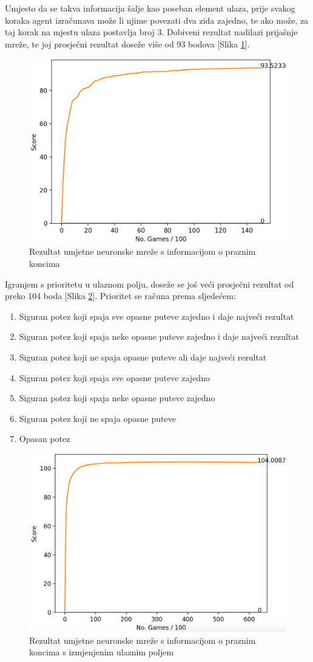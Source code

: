 \documentclass[zavrsnirad]{fer}
\begin{document}
Umjesto da se takva informacija šalje kao poseban element ulaza, prije svakog koraka agent izračunava može li njime povezati dva zida zajedno, te ako može, za taj korak na mjestu ulaza postavlja broj 3. Dobiveni rezultat nadilazi prijašnje mreže, te joj prosječni rezultat doseže više od 93 bodova [Slika \ref{slk:neural_loops2}].

\begin{figure}[htb]
	\centering
	\includegraphics[width=0.58\linewidth]{Figures/loops_graph2.png} 
	\caption{Rezultat umjetne neuronske mreže s informacijom o praznim koncima}
	\label{slk:neural_loops2}
\end{figure}

Igranjem s prioritetu u ulaznom polju, doseže se još veći prosječni rezultat od preko 104 boda [Slika \ref{slk:neural_connections}]. Prioritet se računa prema sljedećem:
\begin{enumerate}
	\item Siguran potez koji spaja sve opasne puteve zajedno i daje najveći rezultat
	\item Siguran potez koji spaja neke opasne puteve zajedno i daje najveći rezultat
	\item Siguran potez koji ne spaja opasne puteve ali daje najveći rezultat
	\item Siguran potez koji spaja sve opasne puteve zajedno
	\item Siguran potez koji spaja neke opasne puteve zajedno
	\item Siguran potez koji ne spaja opasne puteve
	\item Opasan potez
\end{enumerate}

\begin{figure}[htb]
	\centering
	\includegraphics[width=0.58\linewidth]{Figures/najbolja.png} 
	\caption{Rezultat umjetne neuronske mreže s informacijom o praznim koncima s izmjenjenim ulaznim poljem}
	\label{slk:neural_connections}
\end{figure}
\end{document}
